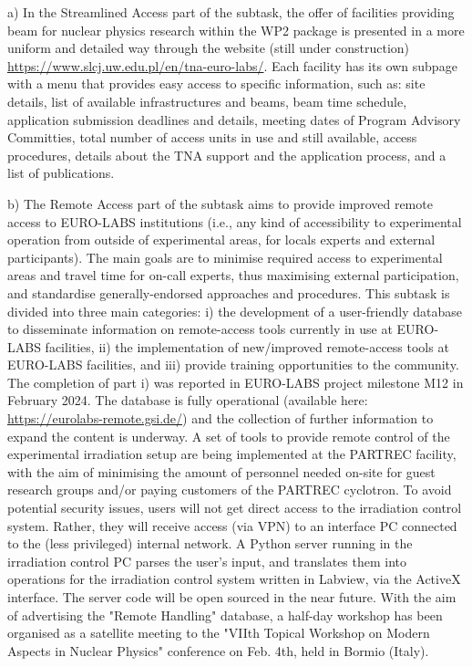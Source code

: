 a) In the Streamlined Access part of the subtask, the offer of facilities providing beam for nuclear physics research within the WP2 package is presented in a more uniform and detailed way  through the website (still under construction) \url{https://www.slcj.uw.edu.pl/en/tna-euro-labs/}. Each facility has its own subpage with a menu that provides easy access to specific information, such as: site details, list of available infrastructures and beams, beam time schedule, application submission deadlines and details, meeting dates of Program Advisory Committies, total number of access units in use and still available, access procedures, details about the TNA support and the application process, and a list of publications. 

b) The Remote Access part of the subtask aims to provide improved remote access to EURO-LABS institutions (i.e., any kind of accessibility to experimental operation from outside of experimental areas, for locals experts and external participants). The main goals are to minimise required access to experimental areas and travel time for on-call experts, thus maximising external participation, and standardise generally-endorsed approaches and procedures. This subtask is divided into three main categories: i) the development of a user-friendly database to disseminate information on remote-access tools currently in use at EURO-LABS facilities, ii) the implementation of new/improved remote-access tools at EURO-LABS facilities, and iii) provide training opportunities to the community. The completion of part i) was reported in EURO-LABS project milestone M12 in February 2024. The database is fully operational (available here: \url{https://eurolabs-remote.gsi.de/}) and the collection of further information to expand the content is underway. A set of tools to provide remote control of the experimental irradiation setup are being implemented at the PARTREC facility, with the aim of minimising the amount of personnel needed on-site for guest research groups and/or paying customers of the PARTREC cyclotron.
To avoid potential security issues, users will not get direct access to the irradiation control system. Rather, they will receive access (via VPN) to an interface PC connected to the (less privileged) internal network.
A Python server running in the irradiation control PC parses the user’s input, and translates them into operations for the irradiation control system written in Labview, via the ActiveX interface. The server code will be open sourced in the near future.
With the aim of advertising the "Remote Handling" database, a half-day workshop has been organised as a satellite meeting to the "VIIth Topical Workshop on Modern Aspects in Nuclear Physics" conference on Feb. 4th, held in Bormio (Italy). 


